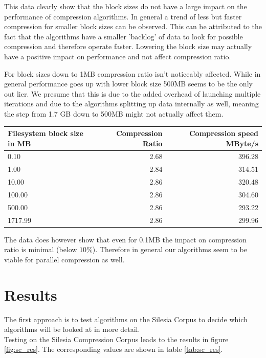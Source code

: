 \documentclass[
	12pt,
	a4paper,
	BCOR10mm,
	DIV14,
	listof=totoc,
	bibliography=totoc,
	headsepline
]{scrreprt}
\begin{document}
\FloatBarrier

This data clearly show that the block sizes do not have a large impact on the performance of compression algorithms. 
In general a trend of less but faster compression for smaller block sizes can be observed.
This can be attributed to the fact that the algorithms have a smaller 'backlog' of data to look for possible compression and therefore operate faster.
Lowering the block size may actually have a positive impact on performance and not affect compression ratio.

For block sizes down to 1MB compression ratio isn't noticeably affected.
While in general performance goes up with lower block size 500MB seems to be the only out lier.
We presume that this is due to the added overhead of launching multiple iterations and due to the algorithms splitting up data internally as well, meaning the step from 1.7 GB down to 500MB might not actually affect them.


\begin{tabular}{|l|r|r|}
\hline
 Filesystem block size in MB &   Compression Ratio &   Compression speed MByte/s \\
\hline
	                    0.10 &                2.68 &                      396.28 \\
	                    1.00 &                2.84 &                      314.51 \\
	                   10.00 &                2.86 &                      320.48 \\
	                  100.00 &                2.86 &                      304.60 \\
	                  500.00 &                2.86 &                      293.22 \\
	                 1717.99 &                2.86 &                      299.96 \\
\hline
\end{tabular}

The data does however show that even for 0.1MB the impact on compression ratio is minimal (below $10\%$). 
Therefore in general our algorithms seem to be viable for parallel compression as well.


\section{Results}
The first approach is to test algorithms on the Silesia Corpus to decide which algorithms will be looked at in more detail.
\\
Testing on the Silesia Compression Corpus leads to the results in figure \ref{fig:sc_res}. 
The corresponding values are shown in table \ref{tab:sc_res}. \\
\end{document}
